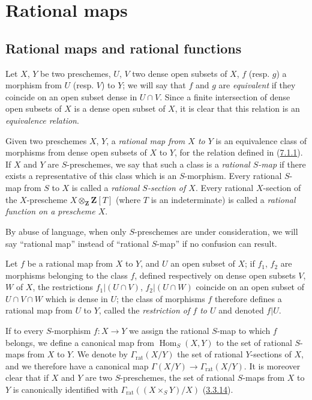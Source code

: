 \section{Rational maps}
\label{section:I.7}

\subsection{Rational maps and rational functions}
\label{subsection:I.7.1}

\begin{env}[7.1.1]
\label{I.7.1.1}
Let $X$, $Y$ be two preschemes, $U$, $V$ two dense open subsets of $X$, $f$
(resp. $g$) a morphism from $U$ (resp. $V$) to $Y$; we will say that $f$ and
$g$ are
\emph{equivalent} if they coincide on an open subset dense in $U\cap V$.
Since a finite intersection of dense open subsets of $X$ is a dense open
subset of $X$, it is clear that this relation is an
\emph{equivalence relation}.
\end{env}

\begin{definition}[7.1.2]
\label{I.7.1.2}
Given two preschemes $X$, $Y$, a
\emph{rational map from $X$ to $Y$} is an equivalence class of morphisms from
dense open subsets of $X$ to $Y$, for the relation defined in
(\hyperref[I.7.1.1]{7.1.1}). If $X$ and $Y$ are
$S$-preschemes, we say that such a class is a
\emph{rational $S$-map} if there exists a representative of this class which
is an $S$-morphism. Every rational $S$-map from $S$ to $X$ is called a
\emph{rational $S$-section of $X$}.
Every rational $X$-section of the $X$-prescheme
$X\otimes_{\mathbf{Z}}\mathbf{Z}[T]$ (where $T$ is an indeterminate) is called
a \emph{rational function on a prescheme $X$}.

By abuse of language, when only $S$-preschemes are under consideration, we
will say ``rational map'' instead of ``rational $S$-map'' if no confusion can
result.

Let $f$ be a rational map from $X$ to $Y$, and $U$ an open subset of $X$; if
$f_1$, $f_2$ are morphisms belonging to the class $f$, defined respectively on
dense open subsets $V$, $W$ of $X$, the restrictions $f_1|(U\cap V)$,
$f_2|(U\cap W)$ coincide on an open subset of $U\cap V\cap W$ which is dense
in $U$; the class of morphisms $f$ therefore defines a rational map from $U$
to $Y$, called the
\emph{restriction of $f$ to $U$} and denoted $f|U$.

If to every $S$-morphism $f:X\to Y$ we assign the rational $S$-map
to which $f$ belongs, we define a canonical map from
$\operatorname{Hom}_S(X,Y)$ to the set of rational $S$-maps from $X$ to $Y$.
We denote by $\Gamma_{\mathrm{rat}}(X/Y)$ the set of rational $Y$-sections of
$X$, and we therefore have a canonical map
$\Gamma(X/Y)\to\Gamma_{\mathrm{rat}}(X/Y)$. It is moreover clear that if $X$
and $Y$ are two $S$-preschemes, the set of rational $S$-maps from $X$ to $Y$
is canonically identified with
$\Gamma_{\mathrm{rat}}((X\times_S Y)/X)$
(\hyperref[I.3.3.14]{3.3.14}).
\end{definition}

